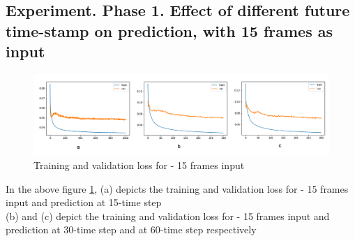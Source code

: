 \subsection{Experiment. Phase 1. Effect of different future time-stamp on prediction, with 15 frames as input}
\begin{figure}[H] 
\includegraphics[scale=0.60]{Phase1-training}
\begin{center}
\caption{Training and validation loss for - 15 frames input }
\label{fig:Phase1-15}
\end{center}
\end{figure}

In the above figure \ref{fig:Phase1-15},  (a) depicts the training and validation loss for - 15 frames input and prediction at 15-time step \\
(b) and (c) depict the training and validation loss for - 15 frames input and prediction at 30-time step and at 60-time step  respectively\\




